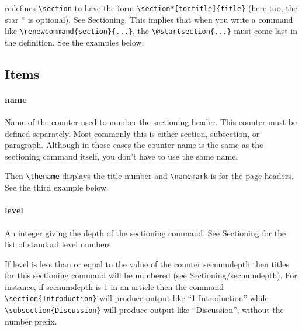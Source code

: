 redefines \verb|\section| to have the form \verb|\section*[toctitle]{title}| (here too, the
star * is optional). See Sectioning. This implies that when you write a command
like \verb|\renewcommand{section}{...}|, the \verb|\@startsection{...}| must come last in the
definition. See the examples below.

\subsection{Items}

\paragraph{name}

Name of the counter used to number the sectioning header. This counter must be
defined separately. Most commonly this is either section, subsection, or
paragraph. Although in those cases the counter name is the same as the
sectioning command itself, you don’t have to use the same name.

Then \verb|\thename| displays the title number and \verb|\namemark| is for the
page headers. See the third example below.

\paragraph{level}

An integer giving the depth of the sectioning command. See Sectioning for the
list of standard level numbers.

If level is less than or equal to the value of the counter secnumdepth then
titles for this sectioning command will be numbered (see
Sectioning/secnumdepth). For instance, if secnumdepth is 1 in an article then
the command \verb|\section{Introduction}| will produce output like ``1
Introduction'' while \verb|\subsection{Discussion}| will produce output like
``Discussion'', without the number prefix.

